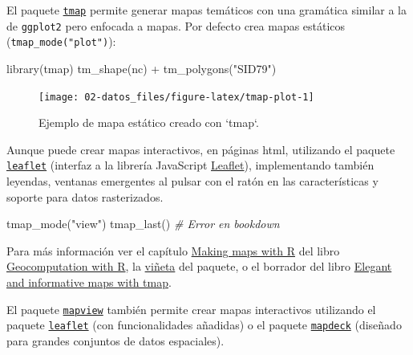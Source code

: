 \documentclass[
  spanish,
]{book}
\newenvironment{Shaded}{\begin{snugshade}}{\end{snugshade}}
\newcommand{\CommentTok}[1]{\textcolor[rgb]{0.56,0.35,0.01}{\textit{#1}}}
\newcommand{\FunctionTok}[1]{\textcolor[rgb]{0.00,0.00,0.00}{#1}}
\newcommand{\NormalTok}[1]{#1}
\newcommand{\SpecialCharTok}[1]{\textcolor[rgb]{0.00,0.00,0.00}{#1}}
\newcommand{\StringTok}[1]{\textcolor[rgb]{0.31,0.60,0.02}{#1}}
\theoremstyle{break}
\theoremstyle{definition}
\theoremstyle{definition}
\theoremstyle{definition}
\theoremstyle{definition}
\theoremstyle{remark}
\begin{document}
El paquete \href{https://r-tmap.github.io/tmap}{\texttt{tmap}} permite generar mapas temáticos con una gramática similar a la de \texttt{ggplot2} pero enfocada a mapas.
Por defecto crea mapas estáticos (\texttt{tmap\_mode("plot")}):

\begin{Shaded}
\begin{Highlighting}[]
\FunctionTok{library}\NormalTok{(tmap)}
\FunctionTok{tm\_shape}\NormalTok{(nc) }\SpecialCharTok{+} \FunctionTok{tm\_polygons}\NormalTok{(}\StringTok{"SID79"}\NormalTok{)}
\end{Highlighting}
\end{Shaded}

\begin{figure}[!htb]

{\centering \texttt{[image: 02-datos\_files/figure-latex/tmap-plot-1]} 

}

\caption{Ejemplo de mapa estático creado con `tmap`.}\label{fig:tmap-plot}
\end{figure}

Aunque puede crear mapas interactivos, en páginas html, utilizando el paquete \href{https://rstudio.github.io/leaflet}{\texttt{leaflet}} (interfaz a la librería JavaScript \href{https://leafletjs.com}{Leaflet}), implementando también leyendas, ventanas emergentes al pulsar con el ratón en las características y soporte para datos rasterizados.

\begin{Shaded}
\begin{Highlighting}[]
\FunctionTok{tmap\_mode}\NormalTok{(}\StringTok{"view"}\NormalTok{)}
\FunctionTok{tmap\_last}\NormalTok{()}
\CommentTok{\# Error en bookdown}
\end{Highlighting}
\end{Shaded}

Para más información ver el capítulo \href{https://geocompr.robinlovelace.net/adv-map.html\#adv-map}{Making maps with R} del libro \href{https://geocompr.robinlovelace.net}{Geocomputation with R}, la \href{https://r-tmap.github.io/tmap/articles/tmap-getstarted.html}{viñeta} del paquete, o el borrador del libro \href{https://r-tmap.github.io}{Elegant and informative maps with tmap}.

El paquete \href{https://r-spatial.github.io/mapview}{\texttt{mapview}} también permite crear mapas interactivos utilizando el paquete \href{https://rstudio.github.io/leaflet}{\texttt{leaflet}} (con funcionalidades añadidas) o el paquete \href{https://symbolixau.github.io/mapdeck}{\texttt{mapdeck}} (diseñado para grandes conjuntos de datos espaciales).
\end{document}
